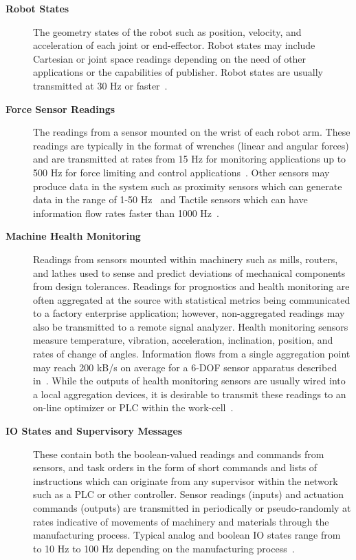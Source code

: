 \begin{description}
	
	\item[\textbf{Robot States}] The geometry states of the robot such as position, velocity, and acceleration of each joint or end-effector. Robot states may include Cartesian or joint space readings depending on the need of other applications or the capabilities of publisher.  Robot states are usually transmitted at 30 Hz or faster~\cite{JMarvel2017}.
	
	\item[\textbf{Force Sensor Readings}] The readings from a sensor mounted on the wrist of each robot arm. These readings are typically in the format of wrenches (linear and angular forces) and are transmitted at rates from 15 Hz for monitoring applications up to 500 Hz for force limiting and control applications~\cite{onrobot}. Other sensors may produce data in the system such as proximity sensors which can generate data in the range of 1-50 Hz~\cite{DiffuseSensorSpecs} and Tactile sensors which can have information flow rates faster than 1000 Hz~\cite{TactileInternet}.
	
	\item[\textbf{Machine Health Monitoring}] Readings from sensors mounted within machinery such as mills, routers, and lathes used to sense and predict deviations of mechanical components from design tolerances. Readings for prognostics and health monitoring are often aggregated at the source with statistical metrics being communicated to a factory enterprise application; however, non-aggregated readings may also be transmitted to a remote signal analyzer.  Health monitoring sensors measure temperature, vibration, acceleration, inclination, position, and rates of change of angles. Information flows from a single aggregation point may reach 200 kB/s on average for a 6-DOF sensor apparatus described in~\cite{ELWeiss}. While the outputs of health monitoring sensors are usually wired into a local aggregation devices, it is desirable to transmit these readings to an on-line optimizer or PLC within the work-cell~\cite{Weiss2016.PHM}.
	
	\item[\textbf{IO States and Supervisory Messages}] These contain both the boolean-valued readings and commands from sensors, and task orders in the form of short commands and lists of instructions which can originate from any supervisor within the network such as a PLC or other controller. Sensor readings (inputs) and actuation commands (outputs) are transmitted in periodically or pseudo-randomly at rates indicative of movements of machinery and materials through the manufacturing process.  Typical analog and boolean IO states range from to 10 Hz to 100 Hz depending on the manufacturing process~\cite{TwinCAT}.
	

\end{description}
